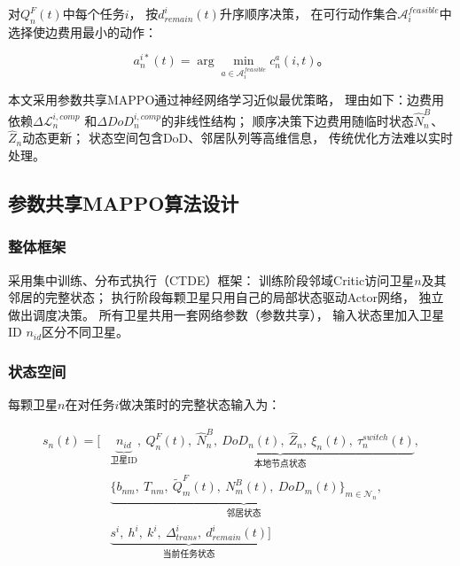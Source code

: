 \documentclass[a4paper,11pt]{article}
\begin{document}
对$Q^F_n(t)$中每个任务$i$，
按$d^i_{remain}(t)$升序顺序决策，
在可行动作集合$\mathcal{A}^{feasible}_i$中选择使边费用最小的动作：

\begin{equation}
a^{i*}_n(t) = \arg\min_{a \in \mathcal{A}^{feasible}_i} c^a_n(i,t)。
\label{eq:scheduling}
\end{equation}

本文采用参数共享MAPPO通过神经网络学习近似最优策略，
理由如下：边费用依赖$\Delta\mathcal{L}^{i,comp}_n$
和$\Delta DoD^{i,comp}_n$的非线性结构；
顺序决策下边费用随临时状态$\hat{N}^B_n$、$\hat{Z}_n$动态更新；
状态空间包含DoD、邻居队列等高维信息，
传统优化方法难以实时处理。

\subsection{参数共享MAPPO算法设计}

\subsubsection{整体框架}

采用集中训练、分布式执行（CTDE）框架：
训练阶段邻域Critic访问卫星$n$及其邻居的完整状态；
执行阶段每颗卫星只用自己的局部状态驱动Actor网络，
独立做出调度决策。
所有卫星共用一套网络参数（参数共享），
输入状态里加入卫星ID $n_{id}$区分不同卫星。

\subsubsection{状态空间}

每颗卫星$n$在对任务$i$做决策时的完整状态输入为：

\begin{equation}
\begin{aligned}
s_n(t) = \Big[
&\underbrace{n_{id}}_{\text{卫星ID}},\
\underbrace{Q^F_n(t),\ \hat{N}^B_n,\ DoD_n(t),\
\hat{Z}_n,\ \xi_n(t),\ \tau^{switch}_n(t)}_{\text{本地节点状态}}, \\
&\underbrace{\{b_{nm},\ T_{nm},\ \tilde{Q}^F_m(t),\
N^B_m(t),\ DoD_m(t)\}_{m \in \mathcal{N}_n}}_{\text{邻居状态}}, \\
&\underbrace{s^i,\ h^i,\ k^i,\ \Delta^i_{trans},\
d^i_{remain}(t)}_{\text{当前任务状态}}
\Big]
\end{aligned}
\label{eq:state}
\end{equation}
\end{document}
